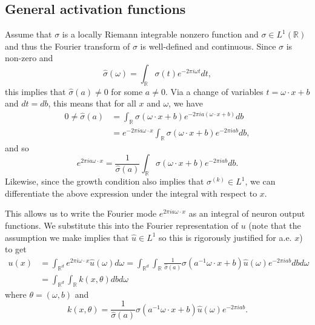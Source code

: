 \subsection{General activation functions}
Assume that $\sigma$ is a locally Riemann integrable nonzero function 
and $\sigma\in L^1(\mathbb{R})$ and thus the Fourier transform of
 $\sigma$ is well-defined and continuous. 
 Since $\sigma$ is non-zero and 
 \begin{equation}\label{key}
 \hat \sigma(\omega) = \int_{\mathbb{R}} \sigma(t)e^{-2\pi i\omega t}dt,
 \end{equation}
 this implies that $\hat{\sigma}(a)\neq 0$ for
 some $a\neq 0$. Via a change of variables $t = \omega\cdot x + b$ and $dt = db$,
  this means that for all $x$ and $\omega$, we have
 \begin{equation}
 \begin{aligned}
  0\neq \hat{\sigma}(a)&= \int_{\mathbb{R}}\sigma(\omega\cdot x+b)e^{-2\pi ia(\omega\cdot x+b)}db \\
 & = e^{-2\pi ia\omega \cdot x} \int_{\mathbb{R}}\sigma(\omega\cdot x+b)e^{-2\pi iab}db ,
 \end{aligned}
 \end{equation}
 and so
 \begin{equation}
  e^{2\pi ia\omega \cdot x} = \frac{1}{\hat{\sigma}(a)}\int_{\mathbb{R}}\sigma(\omega\cdot x+b)e^{-2\pi iab}db.
 \end{equation}
 Likewise, since the growth condition also implies that $\sigma^{(k)}\in L^1$, we can differentiate the above expression  under the integral with respect to $x$.

 This allows us to write the Fourier mode $e^{2\pi ia\omega \cdot x}$ as an integral of neuron output functions. We substitute this
 into the Fourier representation of $u$
 (note that the assumption we make implies that $\hat{u}\in L^1$ so this
 is rigorously justified for a.e. $x$) to get
 \begin{equation}\label{integral_representation}
 \begin{split}
  u(x) &= \int_{\mathbb{R}^d} e^{2\pi i\omega\cdot x}\hat{u}(\omega)d\omega = 
  \int_{\mathbb{R}^d}\int_\mathbb{R}\frac{1}{ \hat{\sigma}(a)}
  \sigma\left(a^{-1}{\omega}\cdot
    x+b\right)\hat{u}(\omega)e^{-2\pi iab}dbd\omega
\\
&=  \int_{\mathbb{R}^d}\int_\mathbb{R} k(x,\theta) dbd\omega 
\end{split}
 \end{equation}
where $\theta=(\omega, b)$ 
and   
$$
k(x,\theta)= \frac{1}{ \hat{\sigma}(a)}
  \sigma\left(a^{-1}{\omega}\cdot
    x+b\right)\hat{u}(\omega)e^{-2\pi iab}.
$$